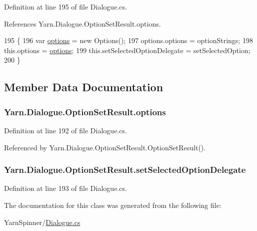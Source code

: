Definition at line 195 of file Dialogue.\-cs.



References Yarn.\-Dialogue.\-Option\-Set\-Result.\-options.


\begin{DoxyCode}
195                                                                                                   \{
196                 var \hyperlink{a00136_abda9c3047ff9d3c3ec5540566a239315}{options} = \textcolor{keyword}{new} Options();
197                 options.options = optionStrings;
198                 this.options = \hyperlink{a00136_abda9c3047ff9d3c3ec5540566a239315}{options};
199                 this.setSelectedOptionDelegate = setSelectedOption;
200             \}
\end{DoxyCode}


\subsection{Member Data Documentation}
\hypertarget{a00136_abda9c3047ff9d3c3ec5540566a239315}{
\subsubsection[{options}]{ Yarn.\-Dialogue.\-Option\-Set\-Result.\-options}}\label{a00136_abda9c3047ff9d3c3ec5540566a239315}


Definition at line 192 of file Dialogue.\-cs.



Referenced by Yarn.\-Dialogue.\-Option\-Set\-Result.\-Option\-Set\-Result().

\hypertarget{a00136_a6f2683598cf0f62b76bb864640cc79dd}{
\subsubsection[{set\-Selected\-Option\-Delegate}]{ Yarn.\-Dialogue.\-Option\-Set\-Result.\-set\-Selected\-Option\-Delegate}}\label{a00136_a6f2683598cf0f62b76bb864640cc79dd}


Definition at line 193 of file Dialogue.\-cs.



The documentation for this class was generated from the following file\-:\begin{DoxyCompactItemize}
\item 
Yarn\-Spinner/\hyperlink{a00285}{Dialogue.\-cs}\end{DoxyCompactItemize}
